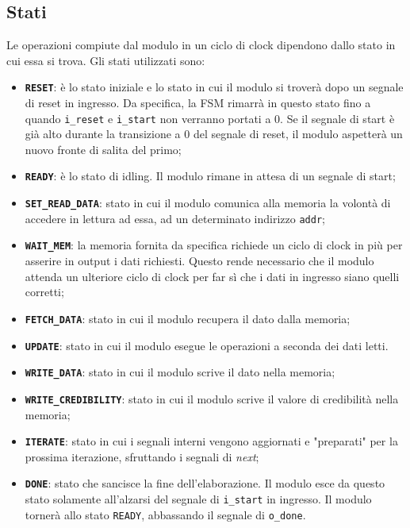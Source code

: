 \documentclass{article}
\begin{document}
\subsection{Stati}
Le operazioni compiute dal modulo in un ciclo di clock dipendono dallo stato in cui essa si trova. Gli stati utilizzati sono:
\begin{itemize}[label=\raisebox{0.25ex}{\tiny$\bullet$}]
    \item \texttt{\textbf{RESET}}: è lo stato iniziale e lo stato in cui il modulo si troverà dopo un segnale di reset in ingresso. Da specifica, la FSM rimarrà in questo stato fino a quando \texttt{i\_reset} e \texttt{i\_start} non verranno portati a 0. Se il segnale di start è già alto durante la transizione a 0 del segnale di reset, il modulo aspetterà un nuovo fronte di salita del primo;
    \item \texttt{\textbf{READY}}: è lo stato di idling. Il modulo rimane in attesa di un segnale di start;
    \item \texttt{\textbf{SET\_READ\_DATA}}: stato in cui il modulo comunica alla memoria la volontà di accedere in lettura ad essa, ad un determinato indirizzo \texttt{addr};
    \item \texttt{\textbf{WAIT\_MEM}}: la memoria fornita da specifica richiede un ciclo di clock in più per asserire in output i dati richiesti. Questo rende necessario che il modulo attenda un ulteriore ciclo di clock per far sì che i dati in ingresso siano quelli corretti;
    \item \texttt{\textbf{FETCH\_DATA}}: stato in cui il modulo recupera il dato dalla memoria;
    \item \texttt{\textbf{UPDATE}}: stato in cui il modulo esegue le operazioni a seconda dei dati letti.
    \item \texttt{\textbf{WRITE\_DATA}}: stato in cui il modulo scrive il dato nella memoria; 
    \item \texttt{\textbf{WRITE\_CREDIBILITY}}: stato in cui il modulo scrive il valore di credibilità nella memoria; 
    \item \texttt{\textbf{ITERATE}}: stato in cui i segnali interni vengono aggiornati e "preparati" per la prossima iterazione, sfruttando i segnali di \textit{next};
    \item \texttt{\textbf{DONE}}: stato che sancisce la fine dell'elaborazione. Il modulo esce da questo stato solamente all'alzarsi del segnale di \texttt{i\_start} in ingresso. Il modulo tornerà allo stato \texttt{READY}, abbassando il segnale di \texttt{o\_done}.
\end{itemize}
\end{document}
